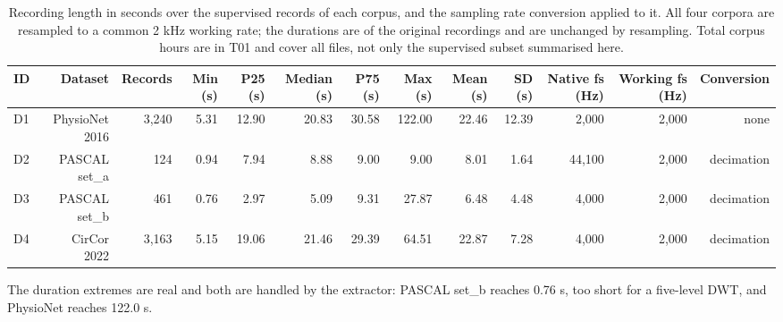\begin{table}[htbp]
  \centering
  \caption{Recording length in seconds over the supervised records of each corpus, and the sampling rate conversion applied to it. All four corpora are resampled to a common 2 kHz working rate; the durations are of the original recordings and are unchanged by resampling. Total corpus hours are in T01 and cover all files, not only the supervised subset summarised here.}
  \label{tab:t03}
  \begin{tabular}{lrrrrrrrrrrrr}
    \toprule
    ID & Dataset & Records & Min (s) & P25 (s) & Median (s) & P75 (s) & Max (s) & Mean (s) & SD (s) & Native fs (Hz) & Working fs (Hz) & Conversion \\
    \midrule
    D1 & PhysioNet 2016 & 3,240 & 5.31 & 12.90 & 20.83 & 30.58 & 122.00 & 22.46 & 12.39 & 2,000 & 2,000 & none \\
    D2 & PASCAL set\_a & 124 & 0.94 & 7.94 & 8.88 & 9.00 & 9.00 & 8.01 & 1.64 & 44,100 & 2,000 & decimation \\
    D3 & PASCAL set\_b & 461 & 0.76 & 2.97 & 5.09 & 9.31 & 27.87 & 6.48 & 4.48 & 4,000 & 2,000 & decimation \\
    D4 & CirCor 2022 & 3,163 & 5.15 & 19.06 & 21.46 & 29.39 & 64.51 & 22.87 & 7.28 & 4,000 & 2,000 & decimation \\
    \bottomrule
  \end{tabular}
  \par\footnotesize The duration extremes are real and both are handled by the extractor: PASCAL set\_b reaches 0.76 s, too short for a five-level DWT, and PhysioNet reaches 122.0 s.
\end{table}
